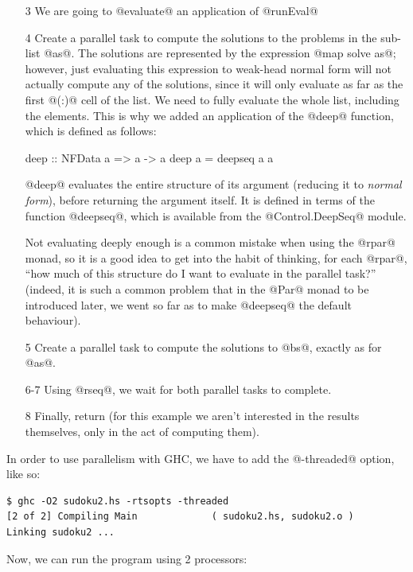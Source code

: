 \begin{itemize}
\item[3] We are going to @evaluate@ an application of @runEval@
\item[4] Create a parallel task to compute the solutions to the
  problems in the sub-list @as@.  The solutions are represented by the
  expression @map solve as@; however, just evaluating this expression
  to weak-head normal form will not actually compute any of the
  solutions, since it will only evaluate as far as the first @(:)@
  cell of the list.  We need to fully evaluate the whole list,
  including the elements.  This is why we added an application of the
  @deep@ function, which is defined as follows:

\begin{haskell}
deep :: NFData a => a -> a
deep a = deepseq a a
\end{haskell}
\noindent @deep@ evaluates the entire structure of its argument
(reducing it to \emph{normal form}), before returning the argument
itself.  It is defined in terms of the function @deepseq@, which is
available from the @Control.DeepSeq@ module.

  Not evaluating deeply enough is a common mistake when using the
  @rpar@ monad, so it is a good idea to get into the habit of
  thinking, for each @rpar@, ``how much of this structure do I want to
  evaluate in the parallel task?'' (indeed, it is such a common
  problem that in the @Par@ monad to be introduced later, we went so
  far as to make @deepseq@ the default behaviour).

\item[5] Create a parallel task to compute the solutions to @bs@,
  exactly as for @as@.
\item[6-7] Using @rseq@, we wait for both parallel tasks to complete.
\item[8] Finally, return (for this example we aren't interested in the
  results themselves, only in the act of computing them).
\end{itemize}

In order to use parallelism with GHC, we have to add the @-threaded@
option, like so:

{\small \begin{verbatim}
$ ghc -O2 sudoku2.hs -rtsopts -threaded
[2 of 2] Compiling Main             ( sudoku2.hs, sudoku2.o )
Linking sudoku2 ...
\end{verbatim}}

\noindent Now, we can run the program using 2 processors:

